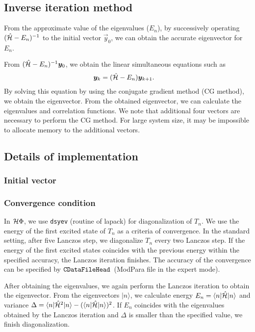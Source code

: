 \subsection{Inverse iteration method}

From the approximate value of the eigenvalues ($E_{n}$),
by successively operating $(\hat{\mathcal{H}}-E_{n})^{-1}$
to the initial vector $\vec{y}_{0}$,
we can obtain the accurate eigenvector for $E_{n}$.

From $(\hat{\mathcal{H}}-E_{n})^{-1}\boldsymbol y_{0}$,
we obtain the linear simultaneous equations such as  
\begin{align}
\boldsymbol y_{k}&=(\hat{\mathcal{H}}-E_{n})\boldsymbol y_{k+1}.
\end{align}
By solving this equation by using the
conjugate gradient method (CG method),
we obtain the eigenvector.
From the obtained eigenvector,
we can calculate the eigenvalues and correlation functions. 
We note that additional four vectors are necessary to
perform the CG method.
For large system size,
it may be impossible to allocate memory to the
additional vectors.

\subsection{Details of implementation}
\subsubsection*{Initial vector}

\subsubsection*{Convergence condition}
In $\mathcal{H} \Phi$,
we use \verb|dsyev| (routine of lapack)
for diagonalization of $T_{n}$.
We use the energy of the first excited state of $T_{n}$
as a criteria of convergence. 
In the standard setting,
after five Lanczos step,
we diagonalize $T_{n}$ every two Lanczos step.
If the energy of the first excited states coincides with
the previous energy within the specified accuracy,
the Lanczos iteration finishes.
The accuracy of the convergence can be specified by 
$\verb|CDataFileHead|$~(ModPara file in the expert mode).

After obtaining the eigenvalues,
we again perform the Lanczos iteration
to obtain the eigenvector.
From the eigenvectors $|n\rangle$,
we calculate 
energy $E_{n}=\langle n|\hat{\mathcal{H}}|n\rangle $ and
variance $\Delta=\langle n|\hat{\mathcal{H}}^{2}|n\rangle -(\langle n|\hat{\mathcal{H}}|n\rangle)^2$.
If $E_{n}$ coincides with the eigenvalues obtained by the Lanczos iteration and 
$\Delta$ is smaller than the specified value,
we finish diagonalization.

